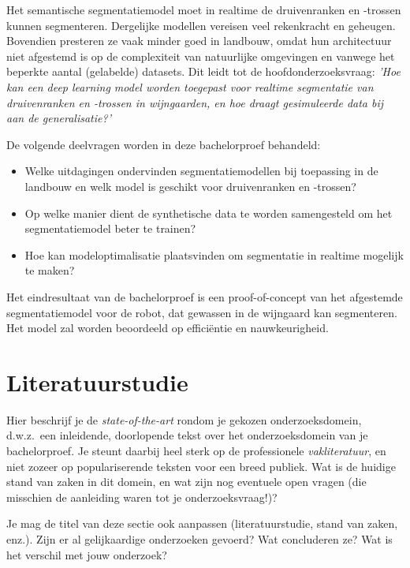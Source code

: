 Het semantische segmentatiemodel moet in realtime de druivenranken en -trossen kunnen segmenteren. Dergelijke modellen vereisen veel rekenkracht en geheugen. Bovendien presteren ze vaak minder goed in landbouw, omdat hun architectuur niet afgestemd is op de complexiteit van natuurlijke omgevingen en vanwege het beperkte aantal (gelabelde) datasets. Dit leidt tot de hoofdonderzoeksvraag: \emph{'Hoe kan een deep learning model worden toegepast voor realtime segmentatie van druivenranken en -trossen in wijngaarden, en hoe draagt gesimuleerde data bij aan de generalisatie?'}

De volgende deelvragen worden in deze bachelorproef behandeld:
\begin{itemize}
    \setlength{\itemsep}{0pt}
    \setlength{\parskip}{0pt} 
    \item Welke uitdagingen ondervinden segmentatiemodellen bij toepassing in de landbouw en welk model is geschikt voor druivenranken en -trossen?
    \item Op welke manier dient de synthetische data te worden samengesteld om het segmentatiemodel beter te trainen?
    \item Hoe kan modeloptimalisatie plaatsvinden om segmentatie in realtime mogelijk te maken?
\end{itemize}

Het eindresultaat van de bachelorproef is een proof-of-concept van het afgestemde segmentatiemodel voor de robot, dat gewassen in de wijngaard kan segmenteren. Het model zal worden beoordeeld op efficiëntie en nauwkeurigheid.


\section{Literatuurstudie}%
\label{sec:literatuurstudie}

Hier beschrijf je de \emph{state-of-the-art} rondom je gekozen onderzoeksdomein, d.w.z.\ een inleidende, doorlopende tekst over het onderzoeksdomein van je bachelorproef. Je steunt daarbij heel sterk op de professionele \emph{vakliteratuur}, en niet zozeer op populariserende teksten voor een breed publiek. Wat is de huidige stand van zaken in dit domein, en wat zijn nog eventuele open vragen (die misschien de aanleiding waren tot je onderzoeksvraag!)?

Je mag de titel van deze sectie ook aanpassen (literatuurstudie, stand van zaken, enz.). Zijn er al gelijkaardige onderzoeken gevoerd? Wat concluderen ze? Wat is het verschil met jouw onderzoek?

